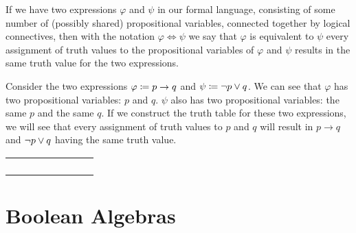 \begin{definition}[Equivalence]
    If we have two expressions $\varphi$ and $\psi$ in our formal language,
    consisting of some number of (possibly shared) propositional variables, connected together by logical connectives,
    then with the notation $\varphi \iff \psi$ we say that $\varphi$ is equivalent to $\psi$
    \iffbydefn every assignment of truth values to the propositional variables of $\varphi$ and $\psi$ results
    in the same truth value for the two expressions.
\end{definition}
\begin{example}
    Consider the two expressions $\varphi \coloneqq p \rightarrow q$ and $\psi \coloneqq \neg p \vee q$.
    We can see that $\varphi$ has two propositional variables: $p$ and $q$.
    $\psi$ also has two propositional variables: the same $p$ and the same $q$.
    If we construct the truth table for these two expressions,
    we will see that every assignment of truth values to $p$ and $q$ will result in $p \rightarrow q$ and $\neg p \vee q$
    having the same truth value.

    \begin{table}[H]
        \centering
        \begin{tabular}{|CcCc||CcCc|} \hline
             &  &  & \\ \hline
            \thead{$\top$} & \thead{$\top$} &  & \\
            \thead{$\top$} & \thead{$\bot$} &  & \\
            \thead{$\bot$} & \thead{$\top$} &  &  \\
            \thead{$\bot$} & \thead{$\bot$} &  &  \\ \hline
        \end{tabular}
    \end{table}
\end{example}

\newpage

\section{Boolean Algebras}

